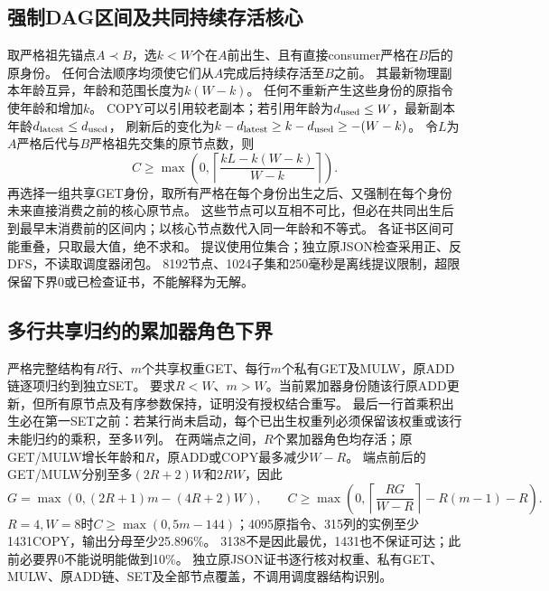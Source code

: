 \documentclass[UTF8,11pt,a4paper]{ctexart}
\begin{document}
\subsection{强制DAG区间及共同持续存活核心}
取严格祖先锚点$A\prec B$，选$k<W$个在$A$前出生、且有直接consumer严格在$B$后的原身份。
任何合法顺序均须使它们从$A$完成后持续存活至$B$之前。
其最新物理副本年龄互异，年龄和范围长度为$k(W-k)$。
任何不重新产生这些身份的原指令使年龄和增加$k$。
COPY可以引用较老副本；若引用年龄为$d_{\rm used}\le W$，最新副本年龄$d_{\rm latest}\le d_{\rm used}$，
刷新后的变化为$k-d_{\rm latest}\ge k-d_{\rm used}\ge-(W-k)$。
令$L$为$A$严格后代与$B$严格祖先交集的原节点数，则
\[
 C\ge\max\left(0,\left\lceil\frac{kL-k(W-k)}{W-k}\right\rceil\right).
\]
再选择一组共享GET身份，取所有严格在每个身份出生之后、又强制在每个身份未来直接消费之前的核心原节点。
这些节点可以互相不可比，但必在共同出生后到最早末消费前的区间内；以核心节点数代入同一年龄和不等式。
各证书区间可能重叠，只取最大值，绝不求和。
提议使用位集合；独立原JSON检查采用正、反DFS，不读取调度器闭包。
8192节点、1024子集和250毫秒是离线提议限制，超限保留下界0或已检查证书，不能解释为无解。

\subsection{多行共享归约的累加器角色下界}
严格完整结构有$R$行、$m$个共享权重GET、每行$m$个私有GET及MULW，原ADD链逐项归约到独立SET。
要求$R<W$、$m>W$。当前累加器身份随该行原ADD更新，但所有原节点及有序参数保持，证明没有授权结合重写。
最后一行首乘积出生必在第一SET之前：若某行尚未启动，每个已出生权重列必须保留该权重或该行未能归约的乘积，至多$W$列。
在两端点之间，$R$个累加器角色均存活；原GET/MULW增长年龄和$R$，原ADD或COPY最多减少$W-R$。
端点前后的GET/MULW分别至多$(2R+2)W$和$2RW$，因此
\[
 G=\max(0,(2R+1)m-(4R+2)W),\qquad
 C\ge\max\left(0,\left\lceil\frac{RG}{W-R}\right\rceil-R(m-1)-R\right).
\]
$R=4,W=8$时$C\ge\max(0,5m-144)$；4095原指令、315列的实例至少1431COPY，输出分母至少25.896\%。
3138不是因此最优，1431也不保证可达；此前必要界0不能说明能做到10\%。
独立原JSON证书逐行核对权重、私有GET、MULW、原ADD链、SET及全部节点覆盖，不调用调度器结构识别。
\end{document}
